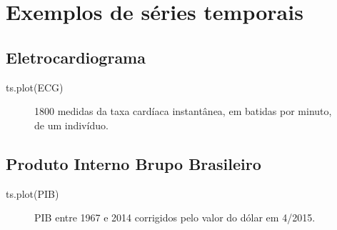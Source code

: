 \documentclass[
  letterpaper,
  DIV=11,
  numbers=noendperiod]{scrreprt}
\newenvironment{Shaded}{\begin{snugshade}}{\end{snugshade}}
\newcommand{\FunctionTok}[1]{\textcolor[rgb]{0.28,0.35,0.67}{#1}}
\newcommand{\NormalTok}[1]{\textcolor[rgb]{0.00,0.23,0.31}{#1}}
\theoremstyle{plain}
\theoremstyle{definition}
\theoremstyle{definition}
\theoremstyle{remark}
\begin{document}
\hypertarget{exemplos-de-suxe9ries-temporais}{%
\section{Exemplos de séries
temporais}\label{exemplos-de-suxe9ries-temporais}}

\hypertarget{eletrocardiograma}{%
\subsection{Eletrocardiograma}\label{eletrocardiograma}}

\begin{Shaded}
\begin{Highlighting}[]
\FunctionTok{ts.plot}\NormalTok{(ECG)}
\end{Highlighting}
\end{Shaded}

\begin{figure}

\begin{minipage}[t]{\linewidth}

{\centering 


\caption{1800 medidas da taxa cardíaca instantânea, em batidas por
minuto, de um indivíduo.}

}

\end{minipage}%

\end{figure}

\hypertarget{produto-interno-brupo-brasileiro}{%
\subsection{Produto Interno Brupo
Brasileiro}\label{produto-interno-brupo-brasileiro}}

\begin{Shaded}
\begin{Highlighting}[]
\FunctionTok{ts.plot}\NormalTok{(PIB)}
\end{Highlighting}
\end{Shaded}

\begin{figure}

\begin{minipage}[t]{\linewidth}

{\centering 


\caption{PIB entre 1967 e 2014 corrigidos pelo valor do dólar em
4/2015.}

}

\end{minipage}%

\end{figure}
\end{document}
